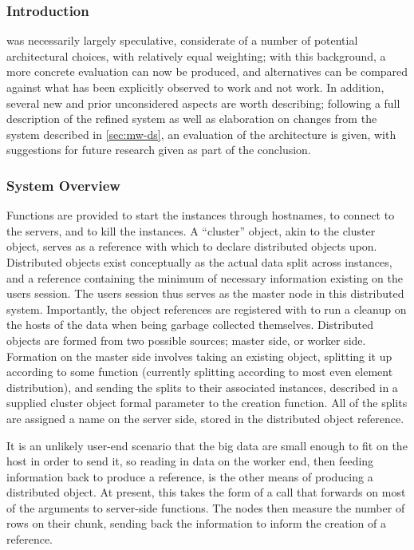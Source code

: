 \subsubsection{Introduction}\label{subsec:further-introduction}

 was necessarily largely speculative, considerate of a number of potential architectural choices, with relatively equal weighting; with this background, a more concrete evaluation can now be produced, and alternatives can be compared against what has been explicitly observed to work and not work.
In addition, several new and prior unconsidered aspects are worth describing; following a full description of the refined system as well as elaboration on changes from the system described in \cref{sec:mw-ds}, an evaluation of the architecture is given, with suggestions for future research given as part of the conclusion.

\subsubsection{System Overview}\label{sec:overview}

Functions are provided to start the instances through hostnames, to connect to the servers, and to kill the instances.
A ``cluster'' object, akin to the  cluster object, serves as a reference with which to declare distributed objects upon.
Distributed objects exist conceptually as the actual data split across  instances, and a reference containing the minimum of necessary information existing on the users \R{} session.
The users \R{} session thus serves as the master node in this distributed system.
Importantly, the object references are registered with  to run a cleanup on the hosts of the data when being garbage collected themselves.
Distributed objects are formed from two possible sources; master side, or worker side.
Formation on the master side involves taking an existing \R{} object, splitting it up according to some function (currently splitting according to most even element distribution), and sending the splits to their associated  instances, described in a supplied cluster object formal parameter to the creation function.
All of the splits are assigned a name on the server side, stored in the distributed object reference.

It is an unlikely user-end scenario that the big data are small enough to fit on the host in order to send it, so reading in data on the worker end, then feeding information back to produce a reference, is the other means of producing a distributed object.
At present, this takes the form of a  call that forwards on most of the arguments to server-side  functions.
The nodes then measure the number of rows on their chunk, sending back the information to inform the creation of a reference.


